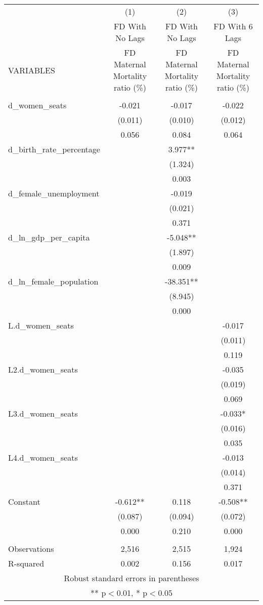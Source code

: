 \begin{tabular}{lccc} \hline
 & (1) & (2) & (3) \\
 & FD With No Lags & FD With No Lags & FD With 6 Lags \\
VARIABLES & FD Maternal Mortality ratio (\%) & FD Maternal Mortality ratio (\%) & FD Maternal Mortality ratio (\%) \\ \hline
 &  &  &  \\
d\_women\_seats & -0.021 & -0.017 & -0.022 \\
 & (0.011) & (0.010) & (0.012) \\
 & 0.056 & 0.084 & 0.064 \\
d\_birth\_rate\_percentage &  & 3.977** &  \\
 &  & (1.324) &  \\
 &  & 0.003 &  \\
d\_female\_unemployment &  & -0.019 &  \\
 &  & (0.021) &  \\
 &  & 0.371 &  \\
d\_ln\_gdp\_per\_capita &  & -5.048** &  \\
 &  & (1.897) &  \\
 &  & 0.009 &  \\
d\_ln\_female\_population &  & -38.351** &  \\
 &  & (8.945) &  \\
 &  & 0.000 &  \\
L.d\_women\_seats &  &  & -0.017 \\
 &  &  & (0.011) \\
 &  &  & 0.119 \\
L2.d\_women\_seats &  &  & -0.035 \\
 &  &  & (0.019) \\
 &  &  & 0.069 \\
L3.d\_women\_seats &  &  & -0.033* \\
 &  &  & (0.016) \\
 &  &  & 0.035 \\
L4.d\_women\_seats &  &  & -0.013 \\
 &  &  & (0.014) \\
 &  &  & 0.371 \\
Constant & -0.612** & 0.118 & -0.508** \\
 & (0.087) & (0.094) & (0.072) \\
 & 0.000 & 0.210 & 0.000 \\
 &  &  &  \\
Observations & 2,516 & 2,515 & 1,924 \\
 R-squared & 0.002 & 0.156 & 0.017 \\ \hline
\multicolumn{4}{c}{ Robust standard errors in parentheses} \\
\multicolumn{4}{c}{ ** p$<$0.01, * p$<$0.05} \\
\end{tabular}
